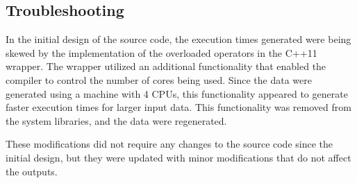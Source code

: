 \documentclass[usletter, 12pt]{article}
\begin{document}
        \clearpage
        \newpage
        \subsection{Troubleshooting}
        In the initial design of the source code, the execution times generated were being skewed by the implementation of the overloaded operators in the C++11 wrapper. The wrapper utilized an additional functionality that enabled the compiler to control the number of cores being used. Since the data were generated using a machine with 4 CPUs, this functionality appeared to generate faster execution times for larger input data. This functionality was removed from the system libraries, and the data were regenerated.

        These modifications did not require any changes to the source code since the initial design, but they were updated with minor modifications that do not affect the outputs.
\end{document}
